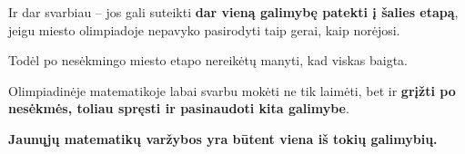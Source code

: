 \documentclass[11pt,a4paper]{article}
\begin{document}
Ir dar svarbiau -- jos gali suteikti \textbf{dar vieną galimybę patekti į šalies etapą}, jeigu miesto olimpiadoje nepavyko pasirodyti taip gerai, kaip norėjosi.

Todėl po nesėkmingo miesto etapo nereikėtų manyti, kad viskas baigta.

Olimpiadinėje matematikoje labai svarbu mokėti ne tik laimėti, bet ir \textbf{grįžti po nesėkmės, toliau spręsti ir pasinaudoti kita galimybe}.

\begin{center}
\textbf{Jaunųjų matematikų varžybos yra būtent viena iš tokių galimybių.}
\end{center}
\end{document}
